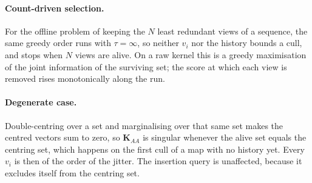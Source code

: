 \paragraph{Count-driven selection.}
For the offline problem of keeping the $N$ least redundant views of a sequence, the same greedy order runs with $\tau=\infty$, so neither $v_i$ nor the history bounds a cull, and stops when $N$ views are alive. On a raw kernel this is a greedy maximisation of the joint information of the surviving set; the score at which each view is removed rises monotonically along the run.

\paragraph{Degenerate case.}
Double-centring over a set and marginalising over that same set makes the centred vectors sum to zero, so $\mathbf{K}_{AA}$ is singular whenever the alive set equals the centring set, which happens on the first cull of a map with no history yet. Every $v_i$ is then of the order of the jitter. The insertion query is unaffected, because it excludes itself from the centring set.
